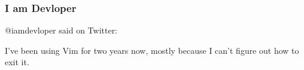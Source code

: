 \begin{frame}[fragile]
  \frametitle{I am Devloper}
  @iamdevloper said on Twitter:

  \vspace{1cm}

  \begin{displayquote}
    I've been using Vim for two years now, mostly because I can't figure out how
    to exit it.
  \end{displayquote}
\end{frame}
